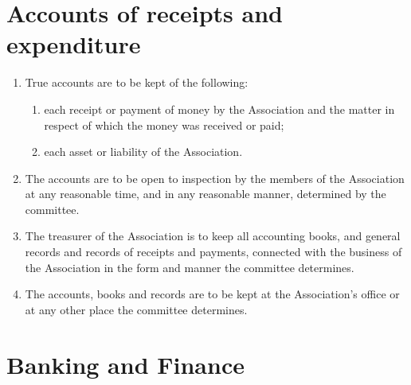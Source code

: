 \documentclass[a4paper,11pt]{article}
\begin{document}
\section{Accounts of receipts and expenditure}

\begin{enumerate}
	\item True accounts are to be kept of the following:
	\begin{enumerate}
		\item each receipt or payment of money by the Association and the matter in respect of which the money was received or paid;
		\item each asset or liability of the Association.
	\end{enumerate}
	
	\item The accounts are to be open to inspection by the members of the Association at any reasonable time, and in any reasonable manner, determined by the committee.
	\item The treasurer of the Association is to keep all accounting books, and general records and records of receipts and payments, connected with the business of the Association in the form and manner the committee determines.
	\item The accounts, books and records are to be kept at the Association's office or at any other place the committee determines.
\end{enumerate}

\section{Banking and Finance}
\end{document}
